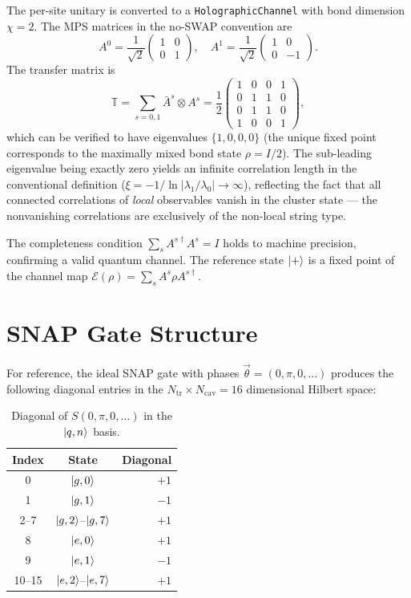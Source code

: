 \documentclass[aps,pra,twocolumn,reprint,floatfix,amsmath,amssymb]{revtex4-2}
\begin{document}
The per-site unitary is converted to a
\texttt{HolographicChannel} with bond dimension $\chi=2$.
The MPS matrices in the no-SWAP convention are
\begin{equation}
  A^0 = \frac{1}{\sqrt{2}}\begin{pmatrix}1&0\\0&1\end{pmatrix},
  \quad
  A^1 = \frac{1}{\sqrt{2}}\begin{pmatrix}1&0\\0&-1\end{pmatrix}.
\end{equation}
The transfer matrix is
\begin{equation}
  \mathbb{T} = \sum_{s=0,1}\bar{A}^s\otimes A^s
  = \frac{1}{2}\begin{pmatrix}
    1&0&0&1\\0&1&1&0\\0&1&1&0\\1&0&0&1
  \end{pmatrix},
\end{equation}
which can be verified to have eigenvalues $\{1,0,0,0\}$ (the unique
fixed point corresponds to the maximally mixed bond state
$\rho=I/2$).  The sub-leading eigenvalue being exactly zero yields
an infinite correlation length in the conventional definition
($\xi=-1/\ln|\lambda_1/\lambda_0|\to\infty$), reflecting the fact
that all connected correlations of \emph{local} observables vanish
in the cluster state
--- the nonvanishing correlations are exclusively of the
non-local string type.

The completeness condition $\sum_s A^{s\dagger}A^s=I$ holds to
machine precision, confirming a valid quantum channel.  The reference
state $\ket{+}$ is a fixed point of the channel map
$\mathcal{E}(\rho)=\sum_s A^s\rho A^{s\dagger}$.

\section{SNAP Gate Structure}\label{app:snap}

For reference, the ideal SNAP gate with phases
$\vec\theta=(0,\pi,0,\ldots)$ produces the following diagonal
entries in the $N_\mathrm{tr}\times N_\mathrm{cav}=16$ dimensional
Hilbert space:

\begin{table}[h]
  \centering
  \caption{Diagonal of
  $S(0,\pi,0,\ldots)$ in the
  $\ket{q,n}$ basis.}\label{tab:snap_diag}
  \begin{tabular}{@{} c c r @{}}
    \toprule
    Index & State & Diagonal \\
    \midrule
    0 & $\ket{g,0}$ & $+1$ \\
    1 & $\ket{g,1}$ & $-1$ \\
    2--7 & $\ket{g,2}$--$\ket{g,7}$ & $+1$ \\
    8 & $\ket{e,0}$ & $+1$ \\
    9 & $\ket{e,1}$ & $-1$ \\
    10--15 & $\ket{e,2}$--$\ket{e,7}$ & $+1$ \\
    \bottomrule
  \end{tabular}
\end{table}
\end{document}
